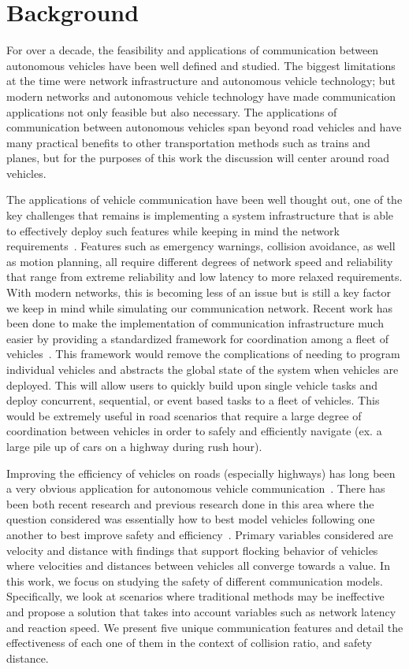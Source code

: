 \section{Background}

For over a decade, the feasibility and applications of communication between autonomous
vehicles have been well defined and studied. The biggest limitations at the time were
network infrastructure and autonomous vehicle technology; but modern networks and
autonomous vehicle technology have made communication applications not only feasible
but also necessary. The applications of communication between autonomous vehicles
span beyond road vehicles and have many practical benefits to other transportation methods
such as trains and planes, but for the purposes of this work the discussion will center
around road vehicles.

The applications of vehicle communication have been well thought out, one of the key
challenges that remains is implementing a system infrastructure that is able to
effectively deploy such features while keeping in mind the network requirements~\cite{willke2009survey}.
Features such as emergency warnings, collision avoidance, as well as motion planning,
all require different degrees of network speed and reliability that range from
extreme reliability and low latency to more relaxed requirements. With modern networks,
this is becoming less of an issue but is still a key factor we keep in mind while
simulating our communication network.
Recent work has been done to make
the implementation of communication infrastructure much easier by providing a standardized
framework for coordination among a fleet of vehicles~\cite{keila2018}.
This framework would remove
the complications of needing to program individual vehicles and abstracts the global
state of the system when vehicles are deployed. This will allow users to quickly build
upon single vehicle tasks and deploy concurrent, sequential, or event based tasks
to a fleet of vehicles. This would be extremely useful in road scenarios that require
a large degree of coordination between vehicles in order to safely and efficiently
navigate (ex. a large pile up of cars on a highway during rush hour).

Improving the efficiency of vehicles on roads (especially highways) has long been a
very obvious application for autonomous vehicle communication~\cite{murray2007recent}.
There has been both recent research and previous research done in this area where the question
considered was essentially how to best model vehicles following one another to best
improve safety and efficiency~\cite{ou2017extended, tanner2003coordination}.
Primary variables considered are velocity
and distance with findings that support flocking behavior of vehicles where velocities
and distances between vehicles all converge towards a value.
In this work, we focus on studying the safety of different communication models.
Specifically, we look at scenarios where traditional methods may be ineffective and propose
a solution that takes into account variables such as network latency and reaction speed.
We present five unique communication features and detail the effectiveness of each one of them
in the context of collision ratio, and safety distance.